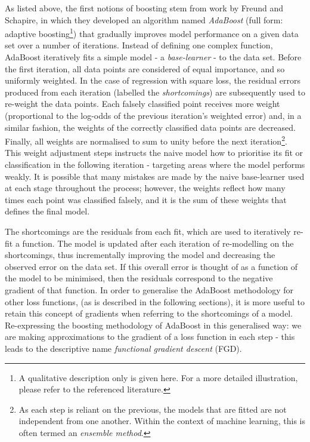 \documentclass{article}
\begin{document}
As listed above, the first notions of boosting stem from work by Freund and Schapire, in which they developed an algorithm named \emph{AdaBoost} (full form: adaptive boosting\footnote{A qualitative description only is given here. For a more detailed illustration, please refer to the referenced literature.}) that gradually improves model performance on a given data set over a number of iterations. Instead of defining one complex function, AdaBoost iteratively fits a simple model - a \emph{base-learner} - to the data set. Before the first iteration, all data points are considered of equal importance, and so uniformly weighted. In the case of regression with square loss, the residual errors produced from each iteration (labelled the \emph{shortcomings}) are subsequently used to re-weight the data points. Each falsely classified point receives more weight (proportional to the log-odds of the previous iteration's weighted error) and, in a similar fashion, the weights of the correctly classified data points are decreased. Finally, all weights are normalised to sum to unity before the next iteration\footnote{As each step is reliant on the previous, the models that are fitted are not independent from one another. Within the context of machine learning, this is often termed an \emph{ensemble method}.}. This weight adjustment steps instructs the naive model how to prioritise its fit or classification in the following iteration - targeting areas where the model performs weakly. It is possible that many mistakes are made by the naive base-learner used at each stage throughout the process; however, the weights reflect how many times each point was classified falsely, and it is the sum of these weights that defines the final model.

The shortcomings are the residuals from each fit, which are used to iteratively re-fit a function. The model is updated after each iteration of re-modelling on the shortcomings, thus incrementally improving the model and decreasing the observed error on the data set. If this overall error is thought of as a function of the model to be minimised, then the residuals correspond to the negative gradient of that function. In order to generalise the AdaBoost methodology for other loss functions, (as is described in the following sections), it is more useful to retain this concept of gradients when referring to the shortcomings of a model. Re-expressing the boosting methodology of AdaBoost in this generalised way: we are making approximations to the gradient of a loss function in each step - this leads to the descriptive name \emph{functional gradient descent} (FGD).
\end{document}
